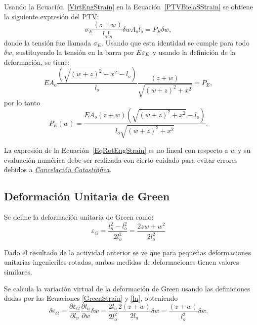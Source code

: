 Usando la Ecuación~\eqref{VirtEngStrain} en la Ecuación~\eqref{PTVBielaSStrain} se obtiene la siguiente expresión del PTV:
%
\begin{equation}
	\sigma_E \frac{(z+w)}{l_o l_n } \delta w A_o l_o  = P_E \delta w,
\end{equation}
%
donde la tensión fue llamada $\sigma_E$. %
%
Usando que esta identidad se cumple para todo $\delta w$, sustituyendo la tensión en la barra por $E \varepsilon_E$ y usando la definición de la deformación, se tiene:
%
\begin{equation}
	E A_o \frac{ \left( \sqrt{ (w+z)^2 + x^2 } - l_o \right) }{ l_o }
	\frac{ (z+w) }{ \sqrt{(w+z)^2+x^2} } = P_E,
\end{equation}
%
por lo tanto
%
\begin{equation}\label{EqRotEngStrain}
	\boxed{
		P_E( w ) = \frac{EA_o(z+w)\left(\sqrt{(w+z)^2+x^2}-l_o\right)}{l_o\sqrt{(w+z)^2+x^2}}.
	}
\end{equation}

La expresión de la Ecuación~\eqref{EqRotEngStrain} es no lineal con respecto a $w$ y su evaluación numérica debe ser realizada con cierto cuidado para evitar errores debidos a \href{https://en.wikipedia.org/wiki/Catastrophic_cancellation}{\textit{Cancelación Catastrófica}}.


\subsection{Deformación Unitaria de Green}

Se define la deformación unitaria de Green como:
%
\begin{equation}\label{GreenStrain}
	\varepsilon_G = \frac{l_n^2 - l_o^2}{2l_o^2} = \frac{2zw+w^2}{2l_o^2}
\end{equation}


Dado el resultado de la actividad anterior se ve que para pequeñas deformaciones unitarias ingenieriles rotadas, ambas medidas de deformaciones tienen valores similares.

Se calcula la variación virtual de la deformación de Green usando las definiciones dadas por las Ecuaciones \eqref{GreenStrain} y \eqref{ln}, obteniendo
%
\begin{equation}\label{VirtGreenStrain}
	\delta \varepsilon_G = \frac{\partial \varepsilon_G}{\partial l_n}\frac{\partial l_n}{\partial w}\delta w =	\frac{2l_n}{2l_o^2}\frac{2(z+w)}{2l_n}\delta w = \frac{(z+w)}{l_o^2}\delta w.
\end{equation}

